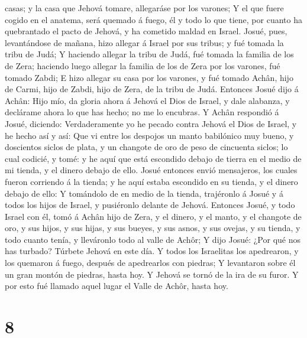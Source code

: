 casas; y la casa que Jehová tomare, allegaráse por los varones;
 Y el que fuere cogido en el anatema, será quemado á
fuego, él y todo lo que tiene, por cuanto ha quebrantado el pacto de
Jehová, y ha cometido maldad en Israel.  Josué, pues,
levantándose de mañana, hizo allegar á Israel por sus tribus; y fué
tomada la tribu de Judá;  Y haciendo allegar la tribu de
Judá, fué tomada la familia de los de Zera; haciendo luego allegar la
familia de los de Zera por los varones, fué tomado Zabdi;
 E hizo allegar su casa por los varones, y fué tomado
Achân, hijo de Carmi, hijo de Zabdi, hijo de Zera, de la tribu de Judá.
 Entonces Josué dijo á Achân: Hijo mío, da gloria ahora á
Jehová el Dios de Israel, y dale alabanza, y declárame ahora lo que has
hecho; no me lo encubras.  Y Achân respondió á Josué,
diciendo: Verdaderamente yo he pecado contra Jehová el Dios de Israel, y
he hecho así y así:  Que vi entre los despojos un manto
babilónico muy bueno, y doscientos siclos de plata, y un changote de oro
de peso de cincuenta siclos; lo cual codicié, y tomé: y he aquí que está
escondido debajo de tierra en el medio de mi tienda, y el dinero debajo
de ello.  Josué entonces envió mensajeros, los cuales
fueron corriendo á la tienda; y he aquí estaba escondido en su tienda, y
el dinero debajo de ello:  Y tomándolo de en medio de la
tienda, trajéronlo á Josué y á todos los hijos de Israel, y pusiéronlo
delante de Jehová.  Entonces Josué, y todo Israel con él,
tomó á Achân hijo de Zera, y el dinero, y el manto, y el changote de
oro, y sus hijos, y sus hijas, y sus bueyes, y sus asnos, y sus ovejas,
y su tienda, y todo cuanto tenía, y lleváronlo todo al valle de Achôr;
 Y dijo Josué: ¿Por qué nos has turbado? Túrbete Jehová
en este día. Y todos los Israelitas los apedrearon, y los quemaron á
fuego, después de apedrearlos con piedras;  Y levantaron
sobre él un gran montón de piedras, hasta hoy. Y Jehová se tornó de la
ira de su furor. Y por esto fué llamado aquel lugar el Valle de Achôr,
hasta hoy.

\hypertarget{section-7}{%
\section{8}\label{section-7}}

